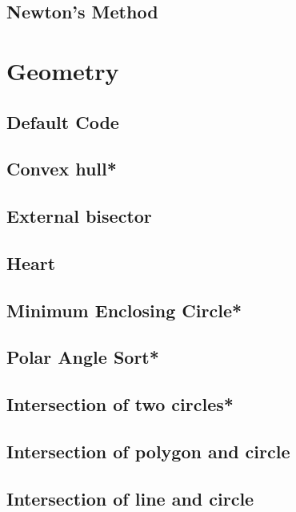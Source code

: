 \subsection{Newton's Method}


\section{Geometry}
\subsection{Default Code}

\subsection{Convex hull*} %

\subsection{External bisector}

\subsection{Heart}

\subsection{Minimum Enclosing Circle*} %

\subsection{Polar Angle Sort*} %

\subsection{Intersection of two circles*} %

\subsection{Intersection of polygon and circle}

\subsection{Intersection of line and circle}

